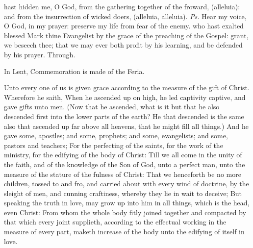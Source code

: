 \properantiphonfix

\introit
{} hast hidden me, O God, from the gathering together of the froward, (alleluia): and from the insurrection of wicked doers, (alleluia, alleluia). \textit{Ps.} Hear my voice, O God, in my prayer: preserve my life from fear of the enemy.
\collect
 who hast exalted blessed Mark thine Evangelist by the grace of the preaching of the Gospel: grant, we beseech thee; that we may ever both profit by his learning, and be defended by his prayer. Through.
\begin{rubric}
    In Lent, Commemoration is made of the Feria.%
\end{rubric}

 Unto every one of us is given grace according to the measure of the gift of Christ. Wherefore he saith, When he ascended up on high, he led captivity captive, and gave gifts unto men. (Now that he ascended, what is it but that he also descended first into the lower parts of the earth? He that descended is the same also that ascended up far above all heavens, that he might fill all things.) And he gave some, apostles; and some, prophets; and some, evangelists; and some, pastors and teachers; For the perfecting of the saints, for the work of the ministry, for the edifying of the body of Christ: Till we all come in the unity of the faith, and of the knowledge of the Son of God, unto a perfect man, unto the measure of the stature of the fulness of Christ: That we henceforth be no more children, tossed to and fro, and carried about with every wind of doctrine, by the sleight of men, and cunning craftiness, whereby they lie in wait to deceive; But speaking the truth in love, may grow up into him in all things, which is the head, even Christ: From whom the whole body fitly joined together and compacted by that which every joint supplieth, according to the effectual working in the measure of every part, maketh increase of the body unto the edifying of itself in love.


